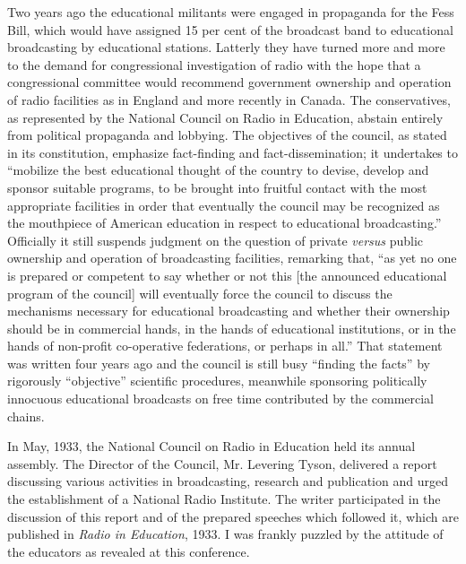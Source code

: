 Two years ago the educational militants were engaged in propaganda for
the Fess Bill, which would have assigned 15 per cent of the broadcast
band to educational broadcasting by educational stations. Latterly they
have turned more and more to the demand for congressional investigation
of radio with the hope that a congressional committee would recommend
government ownership and operation of radio facilities as in England and
more recently in Canada. The conservatives, as represented by the
National Council on Radio in Education, abstain entirely from political
propaganda and lobbying. The objectives of the council, as stated in its
constitution, emphasize fact-finding and fact-dissemination; it
undertakes to ``mobilize the best educational thought of the country to
devise, develop and sponsor suitable programs, to be brought into
fruitful contact with the most appropriate facilities in order that
eventually the council may be recognized as the mouthpiece of American
education in respect to educational broadcasting.'' Officially it still
suspends judgment on the question of private \emph{versus} public
ownership and operation of broadcasting facilities, remarking that, ``as
yet no one is prepared or competent to say whether or not this {[}the
announced educational program of the council{]} will eventually force
the council to discuss the mechanisms necessary for educational
broadcasting and whether their ownership should be in commercial hands,
in the hands of educational institutions, or in the hands of non-profit
co-operative federations, or perhaps in all.'' That statement was
written four years ago and the council is still busy ``finding the
facts'' by rigorously ``objective'' scientific procedures, meanwhile
sponsoring politically innocuous educational broadcasts on free time
contributed by the commercial chains.

In May, 1933, the National Council on Radio in Education held its annual
assembly. The Director of the Council, Mr. Levering Tyson, delivered a
report discussing various activities in broadcasting, research and
publication and urged the establishment of a National Radio Institute.
The writer participated in the discussion of this report and of the
prepared speeches which followed it, which are published in \emph{Radio
in Education}, 1933. I was frankly puzzled by the attitude of the
educators as revealed at this conference.

